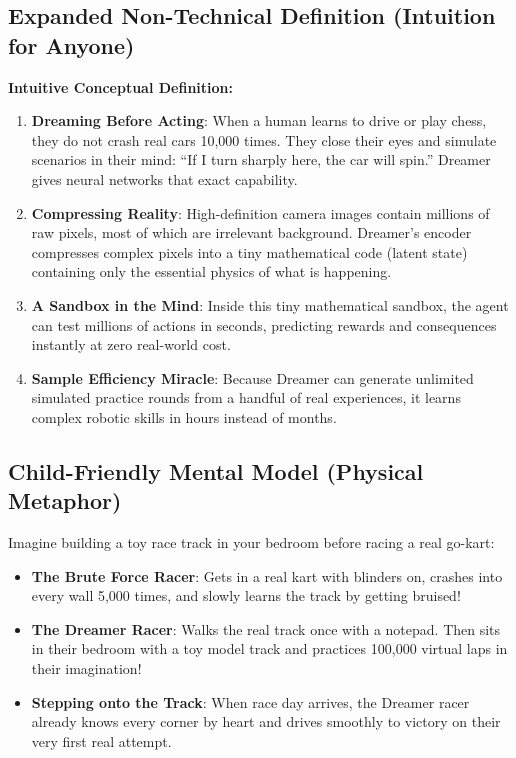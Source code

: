 \documentclass[11pt,a4paper]{article}
\theoremstyle{definition}
\begin{document}
\subsection{Expanded Non-Technical Definition (Intuition for Anyone)}
\textbf{Intuitive Conceptual Definition:}
\begin{enumerate}
    \item \textbf{Dreaming Before Acting}: When a human learns to drive or play chess, they do not crash real cars 10,000 times. They close their eyes and simulate scenarios in their mind: ``If I turn sharply here, the car will spin.'' Dreamer gives neural networks that exact capability.
    \item \textbf{Compressing Reality}: High-definition camera images contain millions of raw pixels, most of which are irrelevant background. Dreamer's encoder compresses complex pixels into a tiny mathematical code (latent state) containing only the essential physics of what is happening.
    \item \textbf{A Sandbox in the Mind}: Inside this tiny mathematical sandbox, the agent can test millions of actions in seconds, predicting rewards and consequences instantly at zero real-world cost.
    \item \textbf{Sample Efficiency Miracle}: Because Dreamer can generate unlimited simulated practice rounds from a handful of real experiences, it learns complex robotic skills in hours instead of months.
\end{enumerate}

\subsection{Child-Friendly Mental Model (Physical Metaphor)}
Imagine building a toy race track in your bedroom before racing a real go-kart:
\begin{itemize}
    \item \textbf{The Brute Force Racer}: Gets in a real kart with blinders on, crashes into every wall 5,000 times, and slowly learns the track by getting bruised!
    \item \textbf{The Dreamer Racer}: Walks the real track once with a notepad. Then sits in their bedroom with a toy model track and practices 100,000 virtual laps in their imagination!
    \item \textbf{Stepping onto the Track}: When race day arrives, the Dreamer racer already knows every corner by heart and drives smoothly to victory on their very first real attempt.
\end{itemize}
\end{document}
